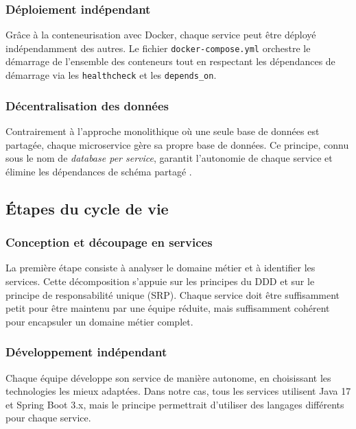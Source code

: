 \documentclass[12pt,a4paper]{article}
\begin{document}
\subsubsection{Déploiement indépendant}

Grâce à la conteneurisation avec Docker, chaque service peut être déployé indépendamment des autres. Le fichier \texttt{docker-compose.yml} orchestre le démarrage de l'ensemble des conteneurs tout en respectant les dépendances de démarrage via les \texttt{healthcheck} et les \texttt{depends\_on}.

\subsubsection{Décentralisation des données}

Contrairement à l'approche monolithique où une seule base de données est partagée, chaque microservice gère sa propre base de données. Ce principe, connu sous le nom de \textit{database per service}, garantit l'autonomie de chaque service et élimine les dépendances de schéma partagé \cite{richardson2018}.

\subsection{Étapes du cycle de vie}

\subsubsection{Conception et découpage en services}

La première étape consiste à analyser le domaine métier et à identifier les services. Cette décomposition s'appuie sur les principes du DDD et sur le principe de responsabilité unique (SRP). Chaque service doit être suffisamment petit pour être maintenu par une équipe réduite, mais suffisamment cohérent pour encapsuler un domaine métier complet.

\subsubsection{Développement indépendant}

Chaque équipe développe son service de manière autonome, en choisissant les technologies les mieux adaptées. Dans notre cas, tous les services utilisent Java 17 et Spring Boot 3.x, mais le principe permettrait d'utiliser des langages différents pour chaque service.
\end{document}
